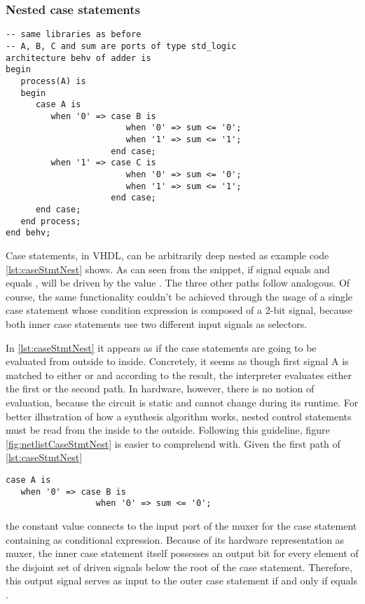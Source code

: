 \subsubsection{Nested case statements}
\leavevmode\begin{lstlisting}[style=vhdl, caption={Code for three nested case
      statements}, label={lst:caseStmtNest}]
-- same libraries as before
-- A, B, C and sum are ports of type std_logic
architecture behv of adder is
begin
   process(A) is
   begin
      case A is
         when '0' => case B is
                        when '0' => sum <= '0';
                        when '1' => sum <= '1';
                     end case;
         when '1' => case C is
                        when '0' => sum <= '0';
                        when '1' => sum <= '1';
                     end case;
      end case;
   end process;
end behv;
\end{lstlisting}

Case statements, in VHDL, can be arbitrarily deep nested as example
code \ref{lst:caseStmtNest} shows. As can seen from the snippet, if
signal  equals  and  equals , 
will be driven by the value . The three other paths follow
analogous.
Of course, the same functionality
couldn't be achieved through the usage of a single case statement
whose condition expression is composed of a 2-bit signal, because both
inner case statements use two different input signals as selectors.

In \ref{lst:caseStmtNest} it appears as if the case statements are
going to be evaluated from outside to inside. Concretely, it seems as
though first signal A is matched to either  or  and
according to the result, the interpreter evaluates either the first or
the second path. In hardware, however, there is no notion of
evaluation, because the circuit is static and cannot change during
its runtime. For better illustration of how a synthesis algorithm
works, nested control statements must be read from the inside to the
outside. Following this guideline, figure \ref{fig:netlistCaseStmtNest}
is easier to comprehend with. Given the first path of \ref{lst:caseStmtNest}
\begin{lstlisting}[style=vhdl]
case A is
   when '0' => case B is
                  when '0' => sum <= '0';
\end{lstlisting}
the constant value  connects to the  input port of the
muxer for the case statement containing  as conditional
expression. Because of its hardware
representation as muxer, the inner case statement itself possesses an
output bit
for every element of the disjoint set of driven signals below the root
of the case statement. Therefore, this output signal serves as input
to the outer case statement if and only if  equals .

